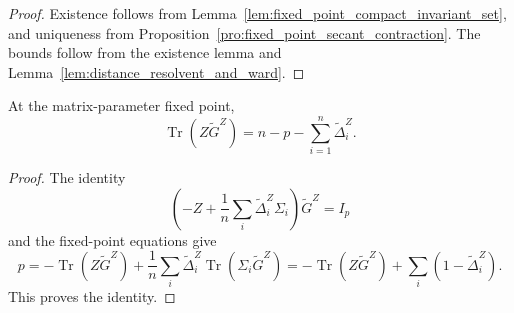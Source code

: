 \documentclass[EJP, preprint, NODS, nobera, nofontexpansion]{ejpecp}
\DeclareMathOperator{\tr}{Tr}
\begin{document}
\begin{proof}
Existence follows from
Lemma~\ref{lem:fixed_point_compact_invariant_set}, and uniqueness from
Proposition~\ref{pro:fixed_point_secant_contraction}.
The bounds follow from the existence lemma and
Lemma~\ref{lem:distance_resolvent_and_ward}.
\end{proof}

\begin{lemma}
\label{lem:deterministic_equivalent_trace_identity}
At the matrix-parameter fixed point,
\[
    \tr(Z\widetilde G^Z)
    =
    n-p-\sum_{i=1}^n\widetilde\Delta_i^Z.
\]
\end{lemma}

\begin{proof}
The identity
\[
    \left(
        -Z+\frac1n\sum_i\widetilde\Delta_i^Z\Sigma_i
    \right)\widetilde G^Z=I_p
\]
and the fixed-point equations give
\[
    p
    =
    -\tr(Z\widetilde G^Z)
    +\frac1n\sum_i\widetilde\Delta_i^Z
        \tr(\Sigma_i\widetilde G^Z)
    =
    -\tr(Z\widetilde G^Z)
    +\sum_i(1-\widetilde\Delta_i^Z).
\]
This proves the identity.
\end{proof}
\end{document}
